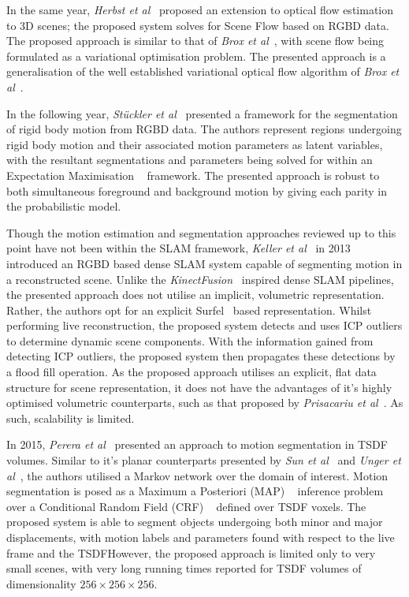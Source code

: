 In the same year, \textit{Herbst et al}~\cite{Herbst2013} proposed an extension to optical 
flow estimation to 3D scenes; the proposed system solves for Scene Flow based on RGBD data. 
The proposed approach is similar to that of \textit{Brox et al}~\cite{Brox2004}, with scene flow 
being formulated as a variational optimisation problem. The presented approach is a generalisation 
of the well established variational optical flow algorithm of \textit{Brox et al}~\cite{Brox2004}.

In the following year, \textit{St{\"u}ckler et al}~\cite{Stueckler2013} presented a framework 
for the segmentation of rigid body motion from RGBD data. The authors represent regions undergoing 
rigid body motion and their associated motion parameters as latent variables, with the resultant 
segmentations and parameters being solved for within an Expectation Maximisation
~\cite{BishopPRML, Murphy2012ML} framework. The presented approach is robust to both simultaneous 
foreground and background motion by giving each parity in the probabilistic model.

Though the motion estimation and segmentation approaches reviewed up to this point have not 
been within the SLAM framework, \textit{Keller et al}~\cite{Keller2013} in 2013 introduced an 
RGBD based dense SLAM system capable of segmenting motion in a reconstructed scene. Unlike the 
\textit{KinectFusion}~\cite{Newcombe2011} inspired dense SLAM pipelines, the presented approach 
does not utilise an implicit, volumetric representation. Rather, the authors opt for an explicit 
Surfel~\cite{Pfister2000} based representation. Whilst performing live reconstruction, the proposed 
system detects and uses ICP outliers to determine dynamic scene components. With the information gained 
from detecting ICP outliers, the proposed system then propagates these detections by a flood fill operation. 
As the proposed approach utilises an explicit, flat data structure for scene representation, it does not 
have the advantages of it's highly optimised volumetric counterparts, such as that proposed by 
\textit{Prisacariu et al}~\cite{Prisacariu2011}. As such, scalability is limited.

In 2015, \textit{Perera et al}~\cite{Perera2015} presented an approach to motion segmentation in 
TSDF volumes. Similar to it's planar counterparts presented by \textit{Sun et al}~\cite{Sun2012} 
and \textit{Unger et al}~\cite{Unger2012}, the authors utilised a Markov network over the domain 
of interest. Motion segmentation is posed as a Maximum a Posteriori (MAP)
~\cite{BishopPRML, Murphy2012ML} inference problem over a Conditional Random Field (CRF)
~\cite{Krahenbuhl2011} defined over TSDF voxels. The proposed system is able to segment objects 
undergoing both minor and major displacements, with motion labels and parameters found with 
respect to the live frame and the TSDF\@ However, the proposed approach is limited only to very 
small scenes, with very long running times reported for TSDF volumes of dimensionality 
\( 256 \times 256 \times 256\).

